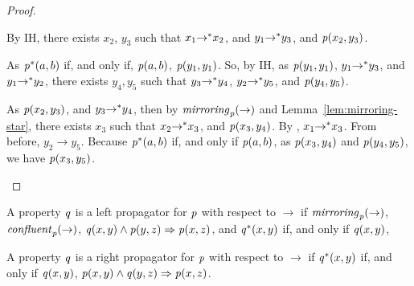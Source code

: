 \documentclass[numbers,10pt,preprint\ifanon ,nocopyrightspace\fi]{sigplanconf}
\begin{document}
\begin{proof}
\begin{case}[\TransitivityRule{}]
    By IH, there exists $x_2$, $y_3$ such that $x_1 {\rightarrow}^* x_2$, and
    $y_1 {\rightarrow}^* y_3$, and $\mathit{p}(x_2,y_3)$.

    As ${\mathit{p}}^*(a,b)$ if, and only if, $\mathit{p}(a,b)$,
    $\mathit{p}(y_1,y_1)$.
    So, by IH, as $\mathit{p}(y_1,y_1)$, $y_1 {\rightarrow}^* y_3$, and
    $y_1 {\rightarrow}^* y_2$, there exists $y_4,y_5$ such that
    $y_3 {\rightarrow}^* y_4$,
    $y_2 {\rightarrow}^* y_5$, and $\mathit{p}(y_4,y_5)$.

    As $\mathit{p}(x_2,y_3)$, and $y_3 {\rightarrow}^* y_4$, then by
    $\mathit{mirroring}_{\mathit{p}}(\rightarrow)$ and
    Lemma~\ref{lem:mirroring-star}, there exists $x_3$ such that
    $x_2 {\rightarrow}^* x_3$, and $\mathit{p}(x_3,y_4)$.
    By \TransitivityRule{}, $x_1 {\rightarrow}^* x_3$.
    From before, $y_2 \rightarrow y_5$.
    Because ${\mathit{p}}^*(a,b)$ if, and only if $\mathit{p}(a,b)$,
    as $\mathit{p}(x_3,y_4)$ and $\mathit{p}(y_4,y_5)$, we have
    $\mathit{p}(x_3,y_5)$.
  \end{case}
\end{proof}

\begin{definition}
  A property $\mathit{q}$ is a left propagator for $\mathit{p}$ with respect to
  $\rightarrow$ if
  $\mathit{mirroring}_{\mathit{p}}(\rightarrow)$,
  $\mathit{confluent}_{\mathit{p}}(\rightarrow)$,
  $\mathit{q}(x,y) \wedge \mathit{p}(y,z) \Rightarrow \mathit{p}(x,z)$,
  and ${\mathit{q}}^*(x,y)$ if, and only if $\mathit{q}(x,y)$,
\end{definition}

\begin{definition}
  A property $\mathit{q}$ is a right propagator for $\mathit{p}$ with respect to
  $\rightarrow$
  if ${\mathit{q}}^*(x,y)$ if, and only if $\mathit{q}(x,y)$,
  $\mathit{p}(x,y) \wedge \mathit{q}(y,z) \Rightarrow \mathit{p}(x,z)$.
\end{definition}
\end{document}
